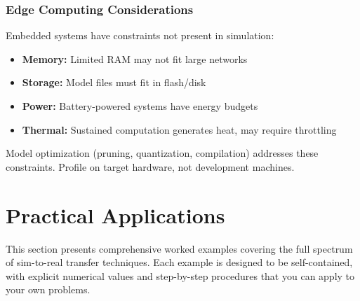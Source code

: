 \subsubsection{Edge Computing Considerations}

Embedded systems have constraints not present in simulation:

\begin{itemize}
    \item \textbf{Memory:} Limited RAM may not fit large networks
    \item \textbf{Storage:} Model files must fit in flash/disk
    \item \textbf{Power:} Battery-powered systems have energy budgets
    \item \textbf{Thermal:} Sustained computation generates heat, may require throttling
\end{itemize}

Model optimization (pruning, quantization, compilation) addresses these constraints. Profile on target hardware, not development machines.

\section{Practical Applications}
\label{sec:practical_applications_sim2real}

This section presents comprehensive worked examples covering the full spectrum of sim-to-real transfer techniques. Each example is designed to be self-contained, with explicit numerical values and step-by-step procedures that you can apply to your own problems.


